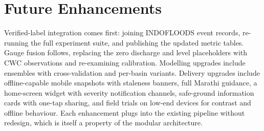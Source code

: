 \documentclass[a4paper,12pt]{report}
\begin{document}
\chapter{Future Enhancements}
Verified-label integration comes first: joining INDOFLOODS event records, re-running the full experiment suite, and publishing the updated metric tables. Gauge fusion follows, replacing the zero discharge and level placeholders with CWC observations and re-examining calibration. Modelling upgrades include ensembles with cross-validation and per-basin variants. Delivery upgrades include offline-capable mobile snapshots with staleness banners, full Marathi guidance, a home-screen widget with severity notification channels, safe-ground information cards with one-tap sharing, and field trials on low-end devices for contrast and offline behaviour. Each enhancement plugs into the existing pipeline without redesign, which is itself a property of the modular architecture.

\renewcommand{\bibname}{References}
\end{document}
